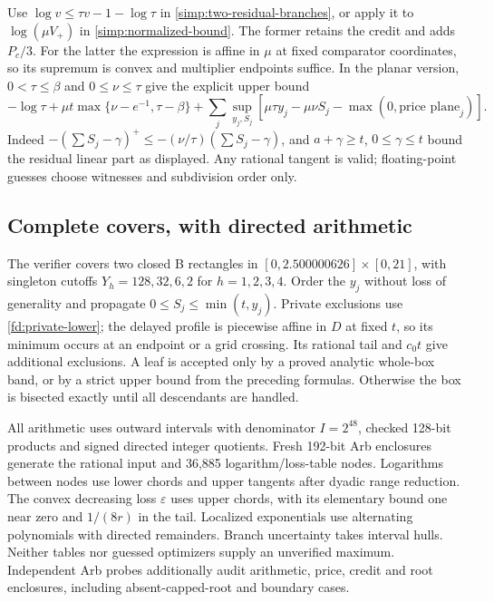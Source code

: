 Use $\log v\le\tau v-1-\log\tau$ in
\eqref{simp:two-residual-branches}, or apply it to $\log(\mu V_+)$ in
\eqref{simp:normalized-bound}. The former retains the credit and adds
$P_c/3$. For the latter the expression is affine in $\mu$ at fixed
comparator coordinates, so its supremum is convex and multiplier
endpoints suffice. In the planar version, $0<\tau\le\beta$ and
$0\le\nu\le\tau$ give the explicit upper bound
\[
 -\log\tau+\mu t\max\{\nu-e^{-1},\tau-\beta\}
 +\sum_j\sup_{y_j,S_j}
        [\mu\tau y_j-\mu\nu S_j-\max(0,\text{price plane}_j)] .
\]
Indeed $-(\sum S_j-\gamma)^+\le-(\nu/\tau)(\sum S_j-\gamma)$,
and $a+\gamma\ge t$, $0\le\gamma\le t$ bound the residual linear
part as displayed. Any rational tangent is valid; floating-point guesses
choose witnesses and subdivision order only.

\subsection{Complete covers, with directed arithmetic}

The verifier covers two closed B rectangles in
$[0,2.500000626]\times[0,21]$, with singleton cutoffs
$Y_h=128,32,6,2$ for $h=1,2,3,4$. Order the $y_j$ without loss of
generality and propagate $0\le S_j\le\min(t,y_j)$.
Private exclusions use \eqref{fd:private-lower}; the delayed profile is
piecewise affine in $D$ at fixed $t$, so its minimum occurs at an endpoint
or a grid crossing. Its rational tail and $c_0t$ give additional exclusions.
A leaf is accepted only by a proved analytic whole-box band, or by a
strict upper bound from the preceding formulas. Otherwise the box is
bisected exactly until all descendants are handled.

All arithmetic uses outward intervals with denominator $I=2^{48}$,
checked 128-bit products and signed directed integer quotients.
Fresh 192-bit Arb enclosures generate the rational input and 36,885
logarithm/loss-table nodes. Logarithms between nodes use lower chords
and upper tangents after dyadic range reduction. The convex decreasing
loss $\varepsilon$ uses upper chords, with its elementary bound one near
zero and $1/(8r)$ in the tail. Localized exponentials use alternating
polynomials with directed remainders. Branch uncertainty takes interval
hulls. Neither tables nor guessed optimizers supply an unverified maximum.
Independent Arb probes additionally audit arithmetic, price, credit and
root enclosures, including absent-capped-root and boundary cases.



